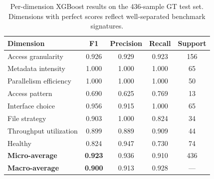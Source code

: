 \begin{table}[t]
\centering
\caption{Per-dimension XGBoost results on the 436-sample GT test set.
Dimensions with perfect scores reflect well-separated benchmark signatures.}
\label{tab:per_label}
\small
\begin{tabular}{lcccc}
\toprule
\textbf{Dimension} & \textbf{F1} & \textbf{Precision} & \textbf{Recall} & \textbf{Support} \\
\midrule
Access granularity        & 0.926 & 0.929 & 0.923 & 156 \\
Metadata intensity        & 1.000 & 1.000 & 1.000 &  65 \\
Parallelism efficiency    & 1.000 & 1.000 & 1.000 &  50 \\
Access pattern            & 0.690 & 0.625 & 0.769 &  13 \\
Interface choice          & 0.956 & 0.915 & 1.000 &  65 \\
File strategy             & 0.903 & 1.000 & 0.824 &  34 \\
Throughput utilization    & 0.899 & 0.889 & 0.909 &  44 \\
Healthy                   & 0.824 & 0.947 & 0.730 &  74 \\
\midrule
\textbf{Micro-average}    & \textbf{0.923} & 0.936 & 0.910 & 436 \\
\textbf{Macro-average}    & \textbf{0.900} & 0.913 & 0.928 & --- \\
\bottomrule
\end{tabular}
\end{table}
